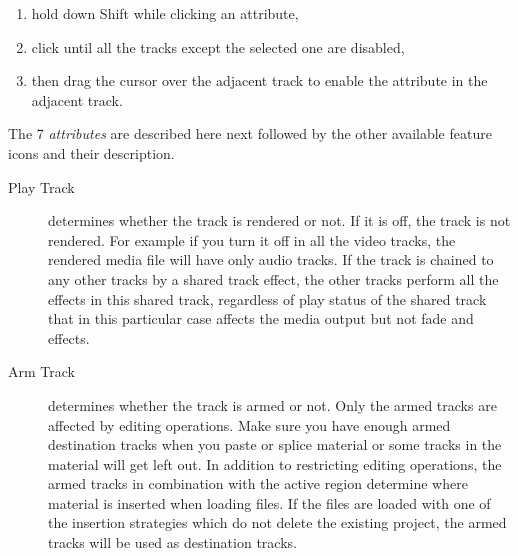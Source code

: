 \begin{enumerate}
\item hold down Shift while clicking an attribute,
\item click until all the tracks except the selected one are
  disabled,
\item then drag the cursor over the adjacent track to enable the
  attribute in the adjacent track.
\end{enumerate}

The 7 \textit{attributes} are described here next followed by the other available feature icons and their description.

\begin{description}
\item[Play Track] determines whether the track is rendered or
  not. If it is off, the track is not rendered.  For example if you
  turn it off in all the video tracks, the rendered media file will
  have only audio tracks.  If the track is chained to any other tracks
  by a shared track effect, the other tracks perform all the effects
  in this shared track, regardless of play status of the shared track
  that in this particular case affects the media output but not fade
  and effects.
\item[Arm Track] determines whether the track is armed or not.
  Only the armed tracks are affected by editing operations. Make sure
  you have enough armed destination tracks when you paste or splice
  material or some tracks in the material will get left out.  In
  addition to restricting editing operations, the armed tracks in
  combination with the active region determine where material is
  inserted when loading files.  If the files are loaded with one of
  the insertion strategies which do not delete the existing project,
  the armed tracks will be used as destination tracks.
\end{description}

